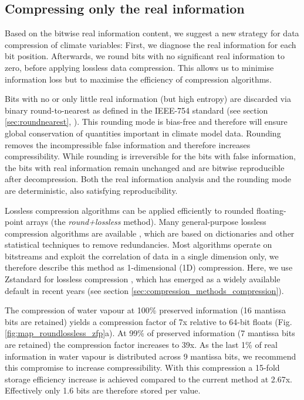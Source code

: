 \subsection{Compressing only the real information}

Based on the bitwise real information content, we suggest a new strategy for data compression of climate variables:
First, we diagnose the real information for each bit position. Afterwards, we round bits with no significant real information
to zero, before applying lossless data compression. This allows us to minimise information loss but to maximise the
efficiency of compression algorithms.

Bits with no or only little real information (but high entropy) are discarded via binary round-to-nearest as defined in the
IEEE-754 standard (see section \ref{sec:roundnearest}, \cite{IEEE1985}). This rounding mode is bias-free and therefore
will ensure global conservation of quantities important in climate model data. Rounding removes the incompressible false
information and therefore increases compressibility. While rounding is irreversible for the bits with false information, the
bits with real information remain unchanged and are bitwise reproducible after decompression. Both the real information
analysis and the rounding mode are deterministic, also satisfying reproducibility.

Lossless compression algorithms can be applied efficiently to rounded floating-point arrays (the \emph{round+lossless} method).
Many general-purpose lossless compression algorithms are available
\citep{Ziv1977,Ziv1978,Huffman1952,Delaunay2019,Deutsch1996,Skibinski2020,Alted2010,Collet2020}, which are based on
dictionaries and other statistical techniques to remove redundancies. Most algorithms operate on bitstreams and exploit the
correlation of data in a single dimension only, we therefore describe this method as 1-dimensional (1D) compression. Here, we
use Zstandard for lossless compression \citep{Collet2020}, which has emerged as a widely available default in recent years
(see section \ref{sec:compression_methods_compression}).

The compression of water vapour at 100\% preserved information (16 mantissa bits are retained) yields a compression
factor of 7x relative to 64-bit floats (Fig. \ref{fig:map_roundlossless_zfp}a). At 99\% of preserved information
(7 mantissa bits are retained) the compression factor increases to 39x. As the last 1\% of real information in water vapour
is distributed across 9 mantissa bits, we recommend this compromise to increase compressibility. With this compression
a 15-fold storage efficiency increase is achieved compared to the current method at 2.67x. Effectively only
1.6 bits are therefore stored per value. 

